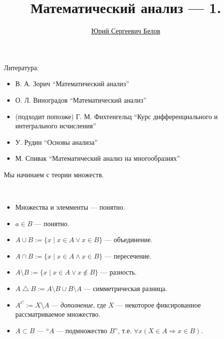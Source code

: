 \documentclass[12pt,a4paper]{article}
\title{Математический анализ --- 1.}
\author{\href{https://vk.com/ybelov}{Юрий Сергеевич Белов}}
\date{}
\begin{document}
    \maketitle

    Литература:
    \begin{itemize}
        \item В. А. Зорич ``Математический анализ''
        \item О. Л. Виноградов ``Математический анализ''
        \item (подходит попозже) Г. М. Фихтенгельц ``Курс дифференциального и интегрального исчисления''
        \item У. Рудин ``Основы анализа''
        \item М. Спивак ``Математический анализ на многообразиях''
    \end{itemize}

    Мы начинаем с теории множеств.

    \begin{definition}\ 
        \begin{itemize}
            \item Множества и элемменты --- понятно.
            \item $a \in B$ --- понятно.
            \item $A \cup B := \{x \mid x\in A \vee x\in B\}$ --- объединение.
            \item $A \cap B := \{x \mid x\in A \wedge x\in B\}$ --- пересечение.
            \item $A \setminus B := \{x \mid x\in A \vee x\notin B\}$ --- разность.
            \item $A \bigtriangleup B := A \setminus B \cup B \setminus A$ --- симметрическая разница.
            \item $A^C := X\setminus A$ --- \emph{дополнение}, где $X$ --- некоторое фиксированное рассматриваемое множество.
            \item $A \subset B$ --- ``$A$ --- подмножество $B$'', т.е. $\forall x (X\in A \Rightarrow x\in B)$.
        \end{itemize}
    \end{definition}
\end{document}
